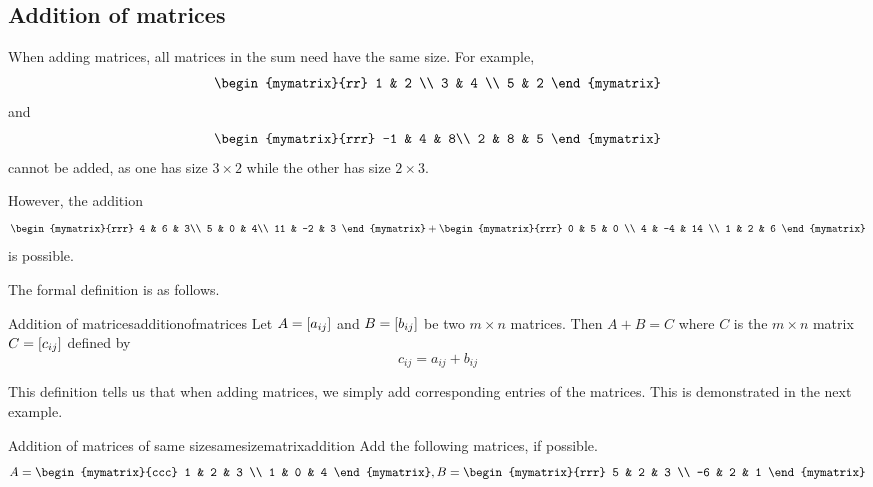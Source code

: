 \subsection{Addition of matrices}

When adding matrices, all matrices in the sum need have the same size.
For example,
\begin{equation*}
\begin{mymatrix}{rr}
1 & 2 \\
3 & 4 \\
5 & 2
\end{mymatrix} 
\end{equation*}
and
\begin{equation*}
\begin{mymatrix}{rrr}
-1 & 4 & 8\\
2 & 8 & 5
\end{mymatrix} 
\end{equation*}
cannot be added, as one has size $3 \times 2$ while the other has size $2 \times 3$.

However, the addition
\begin{equation*}
\begin{mymatrix}{rrr}
4 & 6 & 3\\
5 & 0 & 4\\
11 & -2 & 3
\end{mymatrix} 
+
\begin{mymatrix}{rrr}
0 & 5 & 0 \\
4 & -4 & 14 \\
1 & 2 & 6
\end{mymatrix}
\end{equation*}
is possible.

The formal definition is as follows.

\begin{definition}{Addition of matrices}{additionofmatrices}
Let $A=\left[a_{ij}\right] $ and $B=\left[b_{ij}\right] $ be two
$m\times n$ matrices. Then $A+B=C$ where $C$ is the $m \times n$
matrix $C=\left[c_{ij}\right]$ defined by
\begin{equation*}
c_{ij}=a_{ij}+b_{ij}
\end{equation*}

\end{definition}

This definition tells us that when adding matrices, we simply add corresponding entries of the matrices. 
This is demonstrated in the next example. 

\begin{example}{Addition of matrices of same size}{samesizematrixaddition}
Add the following matrices, if possible.
\begin{equation*}
A = \begin{mymatrix}{ccc}
1 & 2 & 3 \\
1 & 0 & 4
\end{mymatrix},
B = \begin{mymatrix}{rrr}
5 & 2 & 3 \\
-6 & 2 & 1
\end{mymatrix}
\end{equation*}
\end{example}

